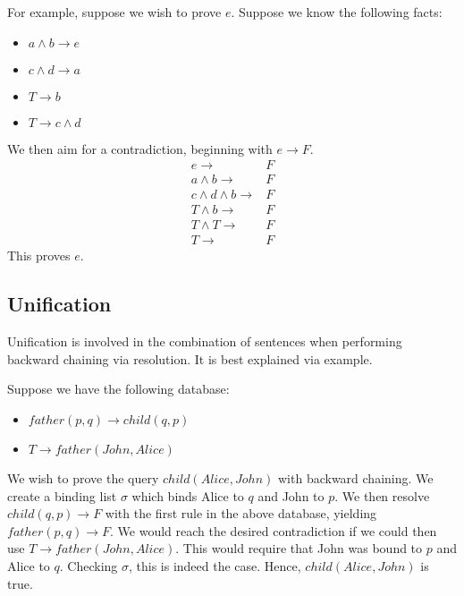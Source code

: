 \documentclass{article}
\begin{document}
    For example, suppose we wish to prove $e$. Suppose we know the following
    facts:
    \begin{itemize}
      \item $a\wedge b\rightarrow e$
      \item $c\wedge d\rightarrow a$
      \item $T \rightarrow b$
      \item $T \rightarrow c\wedge d$
    \end{itemize}
    We then aim for a contradiction, beginning with $e\rightarrow F$.
    \begin{align*}
      e \rightarrow& F                  \tag{assumption}\\
      a\wedge b\rightarrow& F           \tag{$a\wedge b\rightarrow e$}\\
      c\wedge d\wedge b\rightarrow& F   \tag{$c\wedge d\rightarrow a$}\\
      T \wedge b\rightarrow& F          \tag{$T\rightarrow c\wedge d $}\\
      T \wedge T\rightarrow& F          \tag{$T\rightarrow b$}\\
      T \rightarrow& F
    \end{align*}
    This proves $e$.

  \subsection{Unification}
    Unification is involved in the combination of sentences when performing
    backward chaining via resolution. It is best explained via example.

    Suppose we have the following database:
    \begin{itemize}
      \item $father(p,q)\rightarrow child(q,p)$
      \item $T\rightarrow father(John,Alice)$
    \end{itemize}

    We wish to prove the query $child(Alice,John)$ with backward chaining.
    We create a binding list $\sigma$ which binds Alice to $q$ and John to $p$.
    We then resolve $child(q,p)\rightarrow F$ with the first rule in the above
    database, yielding $father(p,q)\rightarrow F$. We would reach the desired
    contradiction if we could then use $T\rightarrow father(John,Alice)$. This
    would require that John was bound to $p$ and Alice to $q$. Checking
    $\sigma$, this is indeed the case. Hence, $child(Alice,John)$ is true.
\end{document}
